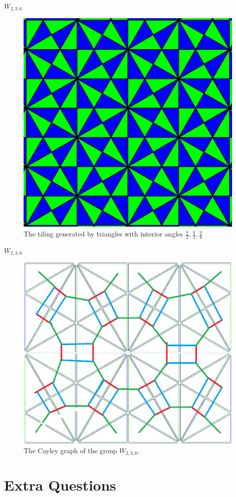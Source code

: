 \documentclass[usenames,dvipsnames]{beamer}
\begin{document}
\begin{frame}{$W_{2,3,6}$}

\begin{figure}[h]
    \centering
    \includegraphics[width=.5\textwidth]{images/7-02-W_236_cayley_graph.png}
    \caption{The tiling generated by triangles with interior angles $\frac{\pi}{2},\frac{\pi}{3},\frac{\pi}{6}$}
\end{figure}

\end{frame}

\begin{frame}{$W_{2,3,6}$}

\begin{figure}[h]
    \centering
    \includegraphics[width=.6\textwidth]{images/7-01-W_236_tiling.png}
    \caption{The Cayley graph of the group $W_{2,3,6}$.}
\end{figure}

\end{frame}

\section{Extra Questions}
\end{document}
